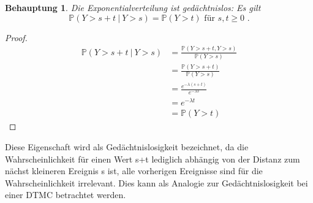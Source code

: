 \documentclass[a4paper]{scrartcl}
\newtheorem*{behaupt}{Behauptung}
\newcommand{\prob}{\mathbb{P}}
\def \blattnr {4}
\begin{document}
\begin{enumerate}[label=\bfseries \blattnr.\arabic*]
\begin{enumerate}
                \begin{behaupt}
                    Die Exponentialverteilung ist gedächtnislos:
                    Es gilt
                    \begin{equation*}
                        \prob(Y > s + t\ |\ Y > s) = \prob(Y > t)
                        \text{ für }
                        s,t \geq 0
                        \text{ .}
                    \end{equation*}
                \end{behaupt}
                \begin{proof}
                    \begin{equation*}
                        \begin{split}
                            \prob(Y > s + t\ |\ Y > s)
                            &= \frac{\prob(Y > s+t, Y > s)}{\prob(Y > s)} \\
                            &= \frac{\prob(Y > s+t)}{\prob(Y > s)} \\
                            &= \frac{e^{-\lambda (s+t)}}{e^{-\lambda s}} \\
                            &= e^{-\lambda t} \\
                            &= \prob(Y > t)
                        \end{split}
                    \end{equation*}
                \end{proof}
                
                Diese Eigenschaft wird als Gedächtnislosigkeit bezeichnet, da
                die Wahrscheinlichkeit für einen Wert s+t lediglich abhängig von
                der Distanz zum nächst kleineren Ereignis s ist, alle vorherigen
                Ereignisse sind für die Wahrscheinlichkeit irrelevant. Dies kann
                als Analogie zur Gedächtnislosigkeit bei einer DTMC betrachtet werden.


\end{enumerate}
\end{enumerate}
\end{document}
